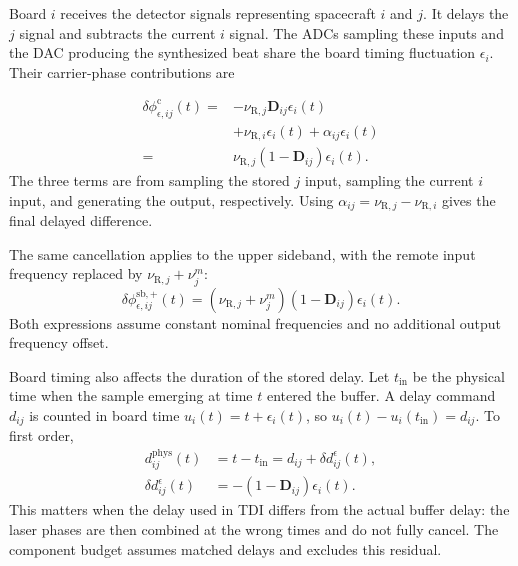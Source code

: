 \documentclass[aps,twocolumn,10pt,nofootinbib,floatfix]{revtex4-2}
\begin{document}
Board $i$ receives the detector signals representing spacecraft $i$ and $j$. It delays the $j$ signal and subtracts the current $i$ signal. The ADCs sampling these inputs and the DAC producing the synthesized beat share the board timing fluctuation $\epsilon_i$. Their carrier-phase contributions are

\begin{align*}
    \delta\phi^{\mathrm c}_{\epsilon,ij}(t)={}&
    -\nu_{\mathrm R,j}\mathbf D_{ij}\epsilon_i(t)\\
    &+\nu_{\mathrm R,i}\epsilon_i(t)+\alpha_{ij}\epsilon_i(t)\\
    ={}&\nu_{\mathrm R,j}(1-\mathbf D_{ij})\epsilon_i(t).
\end{align*}
The three terms are from sampling the stored $j$ input, sampling the current $i$ input, and generating the output, respectively. Using $\alpha_{ij}=\nu_{\mathrm R,j}-\nu_{\mathrm R,i}$ gives the final delayed difference.

The same cancellation applies to the upper sideband, with the remote input frequency replaced by $\nu_{\mathrm R,j}+\nu_j^m$:
\begin{equation*}
    \delta\phi^{\mathrm{sb,+}}_{\epsilon,ij}(t)
    =(\nu_{\mathrm R,j}+\nu_j^m)(1-\mathbf D_{ij})\epsilon_i(t).
\end{equation*}
Both expressions assume constant nominal frequencies and no additional output frequency offset.

Board timing also affects the duration of the stored delay. Let $t_{\mathrm{in}}$ be the physical time when the sample emerging at time $t$ entered the buffer. A delay command $d_{ij}$ is counted in board time $u_i(t)=t+\epsilon_i(t)$, so $u_i(t)-u_i(t_{\mathrm{in}})=d_{ij}$. To first order,
\begin{align}
    d^{\mathrm{phys}}_{ij}(t)&=t-t_{\mathrm{in}}
      =d_{ij}+\delta d^\epsilon_{ij}(t),\\
    \delta d^\epsilon_{ij}(t)&=-(1-\mathbf D_{ij})\epsilon_i(t).
    \label{eq:board_delay_jitter}
\end{align}
This matters when the delay used in TDI differs from the actual buffer delay: the laser phases are then combined at the wrong times and do not fully cancel. The component budget assumes matched delays and excludes this residual.
\end{document}

